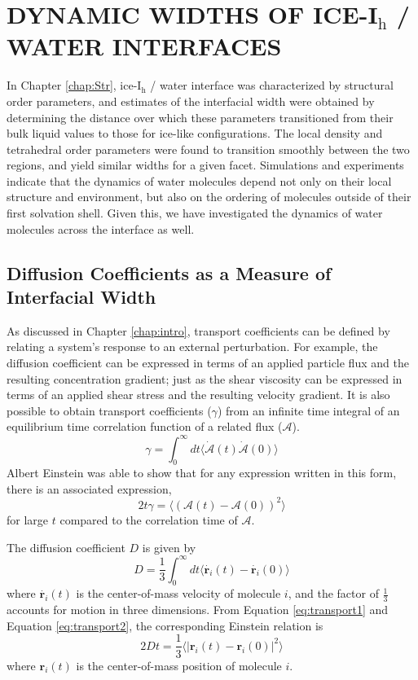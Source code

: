 \chapter{DYNAMIC WIDTHS OF ICE-I$_\mathrm{h}$ / WATER INTERFACES}\label{chap:Dyn}
In Chapter \ref{chap:Str}, ice-I$_\mathrm{h}$ / water interface was
characterized by structural order parameters, and estimates of the
interfacial width were obtained by determining the distance over which
these parameters transitioned from their bulk liquid values to those
for ice-like configurations. The local density and tetrahedral order
parameters were found to transition smoothly between the two regions,
and yield similar widths for a given facet.  Simulations and
experiments indicate that the dynamics of water molecules depend not
only on their local structure and environment, but also on the
ordering of molecules outside of their first solvation shell.\cite{}
Given this, we have investigated the dynamics of water molecules
across the interface as well.

\section{Diffusion Coefficients as a Measure of Interfacial Width}
As discussed in Chapter \ref{chap:intro}, transport coefficients
can be defined by relating a system's response to an external
perturbation. For example, the diffusion coefficient can be expressed
in terms of an applied particle flux and the resulting concentration
gradient; just as the shear viscosity can be expressed in terms of an
applied shear stress and the resulting velocity gradient. It is also
possible to obtain transport coefficients ($\gamma$) from an infinite
time integral of an equilibrium time correlation function of a related
flux ($\mathscr{A}$).
\begin{equation}\label{eq:transport1}
\gamma = \int_0^{\infty} dt \langle \dot{\mathscr{A}}(t)
\dot{\mathscr{A}}(0)\rangle 
\end{equation}
Albert Einstein was able to show that for any expression written in
this form, there is an associated expression,
\begin{equation}\label{eq:transport2}
2t\gamma = \langle (\mathscr{A}(t)-\mathscr{A}(0))^2 \rangle
\end{equation}
for large $t$ compared to the correlation time of $\mathscr{A}$. 

The diffusion coefficient $D$ is given by
\begin{equation}\label{eq:diffusion1}
D = \frac{1}{3} \int_0^{\infty} dt \langle \dot{\mathbf{r}_i}(t) -
\dot{\mathbf{r}_i}(0) \rangle
\end{equation}
where $\dot{\mathbf{r}_i}(t)$ is the center-of-mass velocity of molecule
$i$, and the factor of $\frac{1}{3}$ accounts for motion in three
dimensions. From Equation \eqref{eq:transport1} and Equation \eqref{eq:transport2},
the corresponding Einstein relation is
\begin{equation}\label{eq:diffusion2}
2Dt = \frac{1}{3} \langle | \mathbf{r}_i(t) - \mathbf{r}_i(0) |^2 \rangle
\end{equation}
where $\mathbf{r}_i(t)$ is the center-of-mass position of molecule
$i$. 


